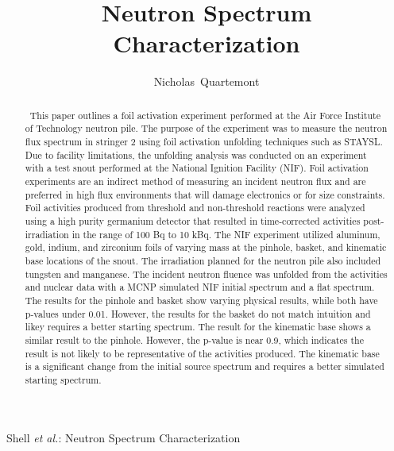 \documentclass[journal]{IEEEtran}
\begin{document}
	\title{Neutron Spectrum Characterization}
	
	\author{Nicholas~Quartemont}
	
	{Shell \MakeLowercase{\textit{et al.}}: Neutron Spectrum Characterization }

	\maketitle
	
	\begin{abstract}
		\ This paper outlines a foil activation experiment performed at the Air Force Institute of Technology neutron pile.
The purpose of the experiment was to measure the neutron flux spectrum in stringer 2 using foil activation unfolding techniques such as STAYSL. 
Due to facility limitations, the unfolding analysis was conducted on an experiment with a test snout performed at the National Ignition Facility (NIF). 
Foil activation experiments are an indirect method of measuring an incident neutron flux and are preferred in high flux environments that will damage electronics or for size constraints. 
Foil activities produced from threshold and non-threshold reactions were analyzed using a high purity germanium detector that resulted in time-corrected activities post-irradiation in the range of 100 Bq to 10 kBq. 
The NIF experiment utilized aluminum, gold, indium, and zirconium foils of varying mass at the pinhole, basket, and kinematic base locations of the snout. 
The irradiation planned for the neutron pile also included tungsten and manganese. 
The incident neutron fluence was unfolded from the activities and nuclear data with a MCNP simulated NIF initial spectrum and a flat spectrum. 
The results for the pinhole and basket show varying physical results, while both have p-values under 0.01. 
However, the results for the basket do not match intuition
and likey requires a better starting spectrum. 
The result for the kinematic base shows a similar result to the pinhole. 
However, the p-value is near 0.9, which indicates the result is not likely to be representative of the activities produced. 
The kinematic base is a significant change from the initial source spectrum and requires a better simulated starting spectrum. 
	\end{abstract}
	
\end{document}
